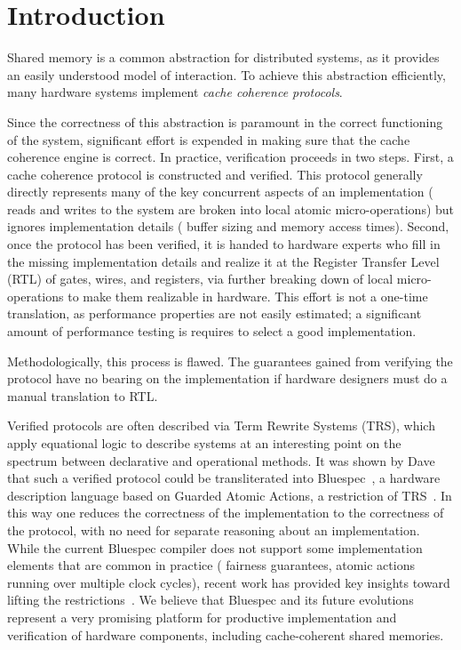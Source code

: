 \section{Introduction}
\label{Sec:Introduction}

Shared memory is a common abstraction for distributed systems, as it
provides an easily understood model of interaction. To achieve this
abstraction efficiently, many hardware systems implement \emph{cache
coherence protocols}.

Since the correctness of this abstraction is paramount in the correct
functioning of the system, significant effort is expended in making sure
that the cache coherence engine is correct. In practice, verification proceeds
in two steps. First, a cache coherence protocol is constructed and
verified. This protocol generally directly represents many of
the key concurrent aspects of an implementation (\eg{} reads and
writes to the system are broken into local atomic micro-operations) but
ignores implementation details (\eg{} buffer sizing and memory access
times). Second, once the protocol has been verified, it is handed to
hardware experts who fill in the missing implementation details and
realize it at the Register Transfer Level (RTL) of gates, wires, and
registers, via further breaking down of local micro-operations to
make them realizable in hardware. This effort is not a one-time translation, as
performance properties are not easily estimated; a significant amount of
performance testing is requires to select a good implementation. 

Methodologically, this process is flawed. The guarantees gained from
verifying the protocol have no bearing on the implementation if
hardware designers must do a manual translation to RTL.

Verified protocols are often described via Term Rewrite Systems (TRS),
which apply equational logic to describe systems at an interesting
point on the spectrum between declarative and operational methods.  It
was shown by Dave \etal{}~\cite{DNA:CoherenceImplementation} that such
a verified protocol could be transliterated into
Bluespec~\cite{Bluespec:TFRG}, a hardware description language based
on Guarded Atomic Actions, a restriction of TRS~\cite{Hoe:TCAD}. In
this way one reduces the correctness of the implementation to the
correctness of the protocol, with no need for separate reasoning about
an implementation. While the current Bluespec compiler does not
support some implementation elements that are common in practice
(\eg{} fairness guarantees, atomic actions running over multiple clock
cycles), recent work has provided key insights toward lifting the
restrictions~\cite{DNA:CoherenceImplementation, Karczmarek}.  We
believe that Bluespec and its future evolutions represent a very
promising platform for productive implementation and verification of
hardware components, including cache-coherent shared memories.

